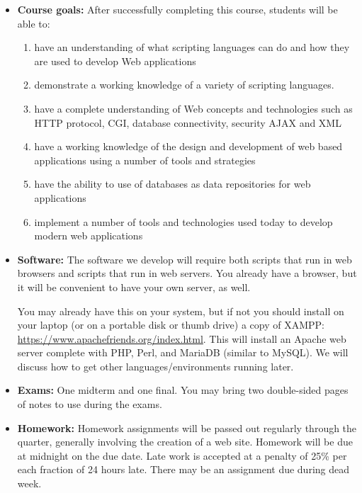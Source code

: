 \documentclass{article}
\begin{document}
\begin{itemize}
\item {\bf Course goals:}  After successfully completing this course,
  students will be able to:
  \begin{enumerate}
    \item have an understanding of what scripting languages can do and
      how they are used to develop Web applications
    \item
      demonstrate a
      working knowledge of a variety of scripting languages.
    \item
      have a complete understanding of
      Web concepts and technologies such as HTTP protocol, CGI,
      database connectivity, security AJAX and XML
    \item have a working
      knowledge of the design and development of web based
      applications using a number of tools and strategies
    \item have the
      ability to use of databases as data repositories for web
      applications
    \item implement a number of tools and technologies
      used today to develop modern web applications
  \end{enumerate}
  

\item {\bf Software:}
  The software we develop will require both scripts that run in
  web browsers and scripts that run in web
  servers.  You already have a browser, but it will be convenient to
  have your own server, as well.

  You may already have this on your system, but if not
you should install on your laptop (or on a portable disk or thumb drive)
a copy of XAMPP: \url{https://www.apachefriends.org/index.html}.  This
will install an Apache web server complete with PHP, Perl, and MariaDB
(similar to MySQL).  We will discuss how to get other
languages/environments running later.

\item {\bf Exams:}   One
  midterm and one final.  You may bring two double-sided pages of notes to use
  during the exams.


\item {\bf Homework:}  Homework assignments will be passed out
  regularly through the quarter, generally involving the creation of a
  web site.   Homework will be due at midnight
  on the due date.  Late work is accepted at a penalty
  of 25\% per each fraction of 24 hours late.  There may be an assignment
  due during dead week.



\end{itemize}
\end{document}
